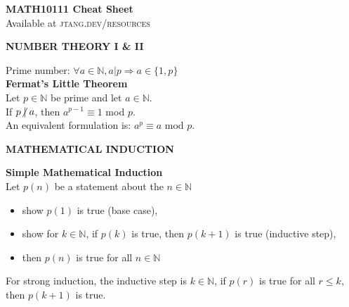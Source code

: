 \documentclass[a4paper]{article}
\begin{document}
	
\begin{center}
	\huge{\textbf{MATH10111 Cheat Sheet}}\\
	\small{Available at \textsc{jtang.dev/resources}}\\
\end{center}
\begin{multicols}{2}

%	

\begin{framed}
	\begin{center}
		\textbf{\textsc{NUMBER THEORY I \& II}}
	\end{center}
	Prime number: $\forall a \in \mathbb{N}, a \vert p \Rightarrow a \in \{1, p\}$\\
	
	\noindent
	\textbf{Fermat's Little Theorem}\\
	Let $p \in \mathbb{N}$ be prime and let $a \in \mathbb{N}$.\\
	If $p \centernot\vert a$, then $a^{p-1} \equiv 1$ mod $p$.\\
	
	\noindent
	An equivalent formulation is: $a^p \equiv a$ mod $p$.
\end{framed}

\begin{framed}
	\begin{center}
		\textbf{\textsc{MATHEMATICAL INDUCTION}}
	\end{center}
	\textbf{Simple Mathematical Induction}\\
	Let $p(n)$ be a statement about the $n\in \mathbb{N}$
	\begin{itemize}
		\item show $p(1)$ is true (base case),
		\item show for $k \in \mathbb{N}$, if $p(k)$ is true, then $p(k+1)$ is true (inductive step),
		\item then $p(n)$ is true for all $n \in \mathbb{N}$
	\end{itemize}
	For strong induction, the inductive step is $k \in \mathbb{N}$, if $p(r)$ is true for all $r \leq k$, then $p(k+1)$ is true. 
\end{framed}


\end{multicols}
\end{document}
